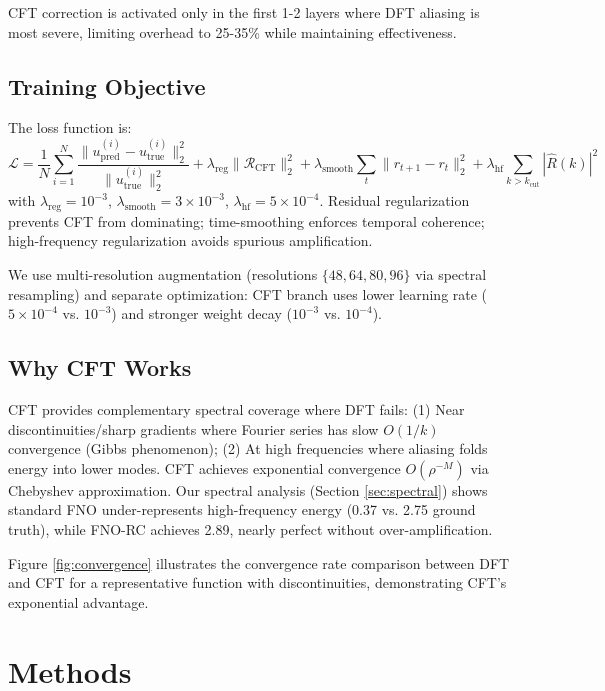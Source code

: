 \documentclass[11pt]{article}
\begin{document}
CFT correction is activated only in the first 1-2 layers where DFT aliasing is most severe, limiting overhead to 25-35\% while maintaining effectiveness.

\subsection{Training Objective}

The loss function is:
\begin{equation}
\mathcal{L} = \frac{1}{N} \sum_{i=1}^{N} \frac{\|u_{\text{pred}}^{(i)} - u_{\text{true}}^{(i)}\|_2^2}{\|u_{\text{true}}^{(i)}\|_2^2} + \lambda_{\text{reg}} \|\mathcal{R}_{\text{CFT}}\|_2^2 + \lambda_{\text{smooth}} \sum_{t} \|r_{t+1} - r_t\|_2^2 + \lambda_{\text{hf}} \sum_{k > k_{\text{cut}}} |\hat{R}(k)|^2
\end{equation}
with $\lambda_{\text{reg}} = 10^{-3}$, $\lambda_{\text{smooth}} = 3 \times 10^{-3}$, $\lambda_{\text{hf}} = 5 \times 10^{-4}$. Residual regularization prevents CFT from dominating; time-smoothing enforces temporal coherence; high-frequency regularization avoids spurious amplification.

We use multi-resolution augmentation (resolutions $\{48, 64, 80, 96\}$ via spectral resampling) and separate optimization: CFT branch uses lower learning rate ($5 \times 10^{-4}$ vs. $10^{-3}$) and stronger weight decay ($10^{-3}$ vs. $10^{-4}$).

\subsection{Why CFT Works}

CFT provides complementary spectral coverage where DFT fails: (1) Near discontinuities/sharp gradients where Fourier series has slow $O(1/k)$ convergence (Gibbs phenomenon); (2) At high frequencies where aliasing folds energy into lower modes. CFT achieves exponential convergence $O(\rho^{-M})$ via Chebyshev approximation. Our spectral analysis (Section \ref{sec:spectral}) shows standard FNO under-represents high-frequency energy (0.37 vs. 2.75 ground truth), while FNO-RC achieves 2.89, nearly perfect without over-amplification.

Figure \ref{fig:convergence} illustrates the convergence rate comparison between DFT and CFT for a representative function with discontinuities, demonstrating CFT's exponential advantage.

\section{Methods}
\end{document}
